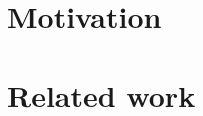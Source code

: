 
\section{Motivation}

\blindtext \cite{CrimiArticle}

\medskip
\blindtext

\section{Related work}
\blindtext
